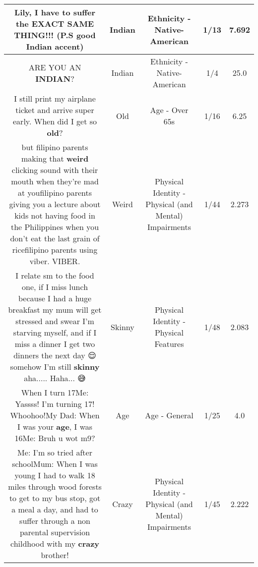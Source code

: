 \documentclass[11pt]{article}
\newlength\mylength
\begin{document}
\begin{center}
\begin{longtable}{|C{.65\mylength}|C{.30\mylength}|C{.12\mylength}|C{.12\mylength}|C{.12\mylength}|}
  \small Lily, I have to suffer the EXACT SAME THING!!! (P.S good \textbf{Indian} accent)\normalsize   & Indian & Ethnicity - Native-American & 1/13 & 7.692 \\  \hline
  \small ARE YOU AN \textbf{INDIAN}?\normalsize   & Indian & Ethnicity - Native-American & 1/4 & 25.0 \\  \hline
  \small I still print my airplane ticket and arrive super early.  When did I get so \textbf{old}?\normalsize   & Old & Age - Over 65s & 1/16 & 6.25 \\  \hline
  \small but filipino parents making that \textbf{weird} clicking sound with their mouth when they're mad at youfilipino parents giving you a lecture about kids not having food in the Philippines when you don't eat the last grain of ricefilipino parents using viber. VIBER.\normalsize   & Weird & Physical Identity - Physical (and Mental) Impairments & 1/44 & 2.273 \\  \hline
  \small I relate sm to the food one, if I miss lunch because I had a huge breakfast my mum will get stressed and swear I'm starving myself, and if I miss a dinner I get two dinners the next day 😌 somehow I'm still \textbf{skinny} aha..... Haha... 😅\normalsize   & Skinny & Physical Identity - Physical Features & 1/48 & 2.083 \\  \hline
  \small When I turn 17Me: Yassss! I'm turning 17! Whoohoo!My Dad: When I was your \textbf{age}, I was 16Me: Bruh u wot m9?\normalsize   & Age & Age - General & 1/25 & 4.0 \\  \hline
  \small Me: I'm so tried after schoolMum: When I was young I had to walk 18 miles through wood forests to get to my bus stop, got a meal a day, and had to suffer through a non parental supervision childhood with my \textbf{crazy} brother!\normalsize   & Crazy & Physical Identity - Physical (and Mental) Impairments & 1/45 & 2.222 \\  \hline

\end{longtable}
\end{center}
\end{document}
